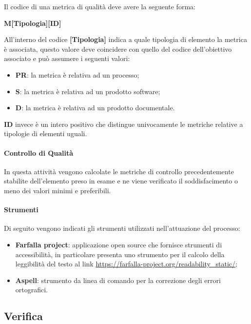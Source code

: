 Il codice di una metrica di qualità deve avere la seguente forma:
\begin{center}
    \textbf{M[Tipologia][ID]}
\end{center}
All'interno del codice \textbf{[Tipologia]} indica a quale tipologia di elemento la metrica è associata, questo valore deve coincidere con
quello del codice dell'obiettivo associato e può assumere i seguenti valori:
\begin{itemize}
	\item \textbf{PR}: la metrica è relativa ad un processo;
	\item \textbf{S}: la metrica è relativa ad un prodotto software;
    \item \textbf{D}: la metrica è relativa ad un prodotto documentale.
\end{itemize}
\textbf{ID} invece è un intero positivo che distingue univocamente le metriche relative a tipologie di elementi uguali.

\paragraph{Controllo di Qualità}
\label{par:controllo_qualita}

In questa attività vengono calcolate le metriche di controllo precedentemente stabilite dell'elemento preso in esame e ne viene verificato
il soddisfacimento o meno dei valori minimi e preferibili.

\paragraph{Strumenti}
\label{par:gestione_qualita:strumenti}

Di seguito vengono indicati gli strumenti utilizzati nell'attuazione del processo:
\begin{itemize}
	\item \textbf{Farfalla project}: applicazione open source che fornisce strumenti di accessibilità, in particolare presenta uno
		strumento per il calcolo della leggibilità del testo al link \url{https://farfalla-project.org/readability_static/};
	\item \textbf{Aspell}: strumento da linea di comando per la correzione degli errori ortografici.
\end{itemize}



\subsection{Verifica}
\label{sub:verifica}

